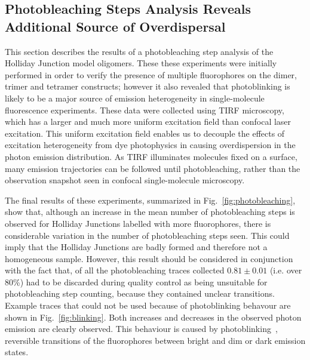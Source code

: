 \subsection{Photobleaching Steps Analysis Reveals Additional Source of Overdispersal}
This section describes the results of a photobleaching step analysis of the Holliday Junction model oligomers. These these experiments were initially performed in order to verify the presence of multiple fluorophores on the dimer, trimer and tetramer constructs; however it also revealed that photoblinking is likely to be a major source of emission heterogeneity in single-molecule fluorescence experiments. These data were collected using TIRF microscopy, which has a larger and much more uniform excitation field than confocal laser excitation. This uniform excitation field enables us to decouple the effects of excitation heterogeneity from dye photophysics in causing overdispersion in the photon emission distribution. As TIRF illuminates molecules fixed on a surface,  many emission trajectories can be followed until photobleaching, rather than the observation snapshot seen in confocal single-molecule microscopy.  

The final results of these experiments, summarized in Fig.~\ref{fig:photobleaching}, show that, although  an increase in the mean number of photobleaching steps is observed for Holliday Junctions labelled with more fluorophores, there is considerable variation in the number of photobleaching steps seen. This could imply that the Holliday Junctions are badly formed and therefore not a homogeneous sample. However, this result should be considered in conjunction with the fact that, of all the photobleaching traces collected $0.81 \pm 0.01$ (i.e. over 80\%) had to be discarded during quality control as being unsuitable for photobleaching step counting, because they contained unclear transitions. Example traces that could not be used because of photoblinking behavour are shown in Fig.~\ref{fig:blinking}. Both increases and decreases in the observed photon emission are clearly observed. This behaviour is caused by photoblinking~\cite{zondervan03}, reversible transitions of the fluorophores between bright and dim or dark emission states.


